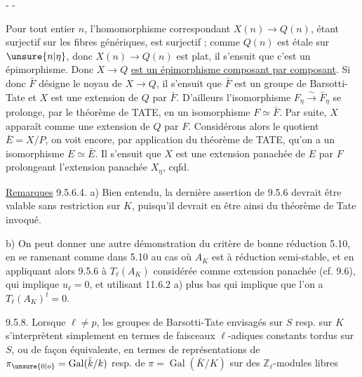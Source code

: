 \begin{center}-  -\end{center}

Pour tout entier $n$, l'homomorphisme correspondant $X(n)\longrightarrow Q(n)$, étant surjectif sur les fibres génériques, est surjectif ; comme $Q(n)$ est étale sur $\unsure{n|\eta}$, donc $X(n)\longrightarrow Q(n)$ est plat, il s'ensuit que c'est un épimorphisme. Donc $X\longrightarrow Q$ \uline{est un épimorphisme composant par composant}. Si donc $\bar F$ désigne le noyau de $X\longrightarrow Q$, il s'ensuit que $\bar F$ est un groupe de Barsotti-Tate et $X$ est une extension de $Q$ par $\bar F$. D'ailleurs l'isomorphisme $F_\eta\overset\sim\longrightarrow\bar F_\eta$ se prolonge, par le théorème de TATE, en un isomorphisme $F\simeq\bar F$. Par suite, $X$ apparaît comme une extension de $Q$ par $F$. Considérons alors le quotient $\bar E=X/P$, on voit encore, par application du théorème de TATE, qu'on a un isomorphisme $E\simeq\bar E$. Il s'ensuit que $X$ est une extension panachée de $E$ par $F$ prolongeant l'extension panachée $X_\eta$, cqfd.

\uline{Remarques} 9.5.6.4. a) Bien entendu, la dernière assertion de 9.5.6 devrait être valable sans restriction sur $K$, puisqu'il devrait en être ainsi du théorème de Tate invoqué.

b) On peut donner une autre démonstration du critère de bonne réduction 5.10, en se ramenant comme dans 5.10 au cas où $A_K$ est à réduction semi-stable, et en appliquant alors 9.5.6 à $T_\ell(A_K)$ considérée comme extension panachée (cf. 9.6), qui implique $u_\ell=0$, et utilisant 11.6.2 a) plus bas qui implique que l'on a $T_\ell(A_K)^t=0$.

9.5.8. Lorsque $\ell\neq p$, les groupes de Barsotti-Tate envisagés sur $S$ resp. sur $K$ s'interprètent simplement en termes de faisceaux $\ell$-adiques constants tordus sur $S$, ou de façon équivalente, en termes de représentations de $\pi_{\unsure{0|o}}=\operatorname{Gal}(\bar k/k)$ resp. de $\pi=\operatorname{Gal}(\bar K/K)$ sur des $\mathbb Z_\ell$-modules libres

